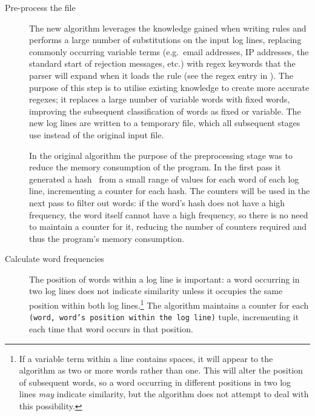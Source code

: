 \begin{description}

    \item [Pre-process the file]  The new algorithm leverages the knowledge
        gained when writing rules and performs a large number of
        substitutions on the input log lines, replacing commonly occurring
        variable terms (e.g.\ email addresses, \gls{IP} addresses, the
        standard start of rejection messages, etc.) with regex keywords
        that the parser will expand when it loads the rule (see the
        regex entry in ).  The purpose of
        this step is to utilise existing knowledge to create more accurate
        regexes; it replaces a large number of variable words with fixed
        words, improving the subsequent classification of words as fixed or
        variable.  The new log lines are written to a temporary file, which
        all subsequent stages use instead of the original input file.

        In the original algorithm the purpose of the preprocessing stage
        was to reduce the memory consumption of the program.  In the first
        pass it generated a hash~\cite{hash-functions} from a small range
        of values for each word of each log line, incrementing a counter
        for each hash.  The counters will be used in the next pass to
        filter out words: if the word's hash does not have a high
        frequency, the word itself cannot have a high frequency, so there
        is no need to maintain a counter for it, reducing the number of
        counters required and thus the program's memory consumption.

    \item [Calculate word frequencies]  The position of words within a log
        line is important: a word occurring in two log lines does not
        indicate similarity unless it occupies the same position within
        both log lines.\footnote{If a variable term within a line contains
        spaces, it will appear to the algorithm as two or more words rather
        than one.  This will alter the position of subsequent words, so a
        word occurring in different positions in two log lines
        \textit{may\/} indicate similarity, but the algorithm does not
        attempt to deal with this possibility.}  The algorithm maintains a
        counter for each \texttt{(word, word's position within the log
        line)} tuple, incrementing it each time that word occurs in that
        position.


\end{description}
